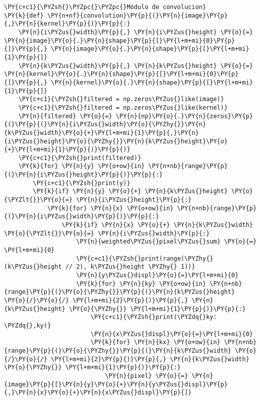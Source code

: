 \begin{tcolorbox}[breakable, size=fbox, boxrule=1pt, pad at break*=1mm,colback=cellbackground, colframe=cellborder]
\begin{Verbatim}[commandchars=\\\{\}]
\PY{c+c1}{\PYZsh{}\PYZpc{}\PYZpc{}Módulo de convolucion}
\PY{k}{def} \PY{n+nf}{convolution}\PY{p}{(}\PY{n}{image}\PY{p}{,}\PY{n}{kernel}\PY{p}{)}\PY{p}{:}
    \PY{n}{i\PYZus{}width}\PY{p}{,} \PY{n}{i\PYZus{}height} \PY{o}{=} \PY{n}{image}\PY{o}{.}\PY{n}{shape}\PY{p}{[}\PY{l+m+mi}{0}\PY{p}{]}\PY{p}{,} \PY{n}{image}\PY{o}{.}\PY{n}{shape}\PY{p}{[}\PY{l+m+mi}{1}\PY{p}{]}
    \PY{n}{k\PYZus{}width}\PY{p}{,} \PY{n}{k\PYZus{}height} \PY{o}{=} \PY{n}{kernel}\PY{o}{.}\PY{n}{shape}\PY{p}{[}\PY{l+m+mi}{0}\PY{p}{]}\PY{p}{,} \PY{n}{kernel}\PY{o}{.}\PY{n}{shape}\PY{p}{[}\PY{l+m+mi}{1}\PY{p}{]}
    \PY{c+c1}{\PYZsh{}filtered = np.zeros\PYZus{}like(image)}
    \PY{c+c1}{\PYZsh{}filtered = np.zeros\PYZus{}like(kernel)}
    \PY{n}{filtered} \PY{o}{=} \PY{n}{np}\PY{o}{.}\PY{n}{zeros}\PY{p}{(}\PY{p}{(}\PY{n}{i\PYZus{}width}\PY{o}{\PYZhy{}}\PY{n}{k\PYZus{}width}\PY{o}{+}\PY{l+m+mi}{1}\PY{p}{,}\PY{n}{i\PYZus{}height}\PY{o}{\PYZhy{}}\PY{n}{k\PYZus{}height}\PY{o}{+}\PY{l+m+mi}{1}\PY{p}{)}\PY{p}{)}
    \PY{c+c1}{\PYZsh{}print(filtered)}
    \PY{k}{for} \PY{n}{y} \PY{o+ow}{in} \PY{n+nb}{range}\PY{p}{(}\PY{n}{i\PYZus{}height}\PY{p}{)}\PY{p}{:}
        \PY{c+c1}{\PYZsh{}print(y)}
        \PY{k}{if} \PY{n}{y} \PY{o}{+} \PY{n}{k\PYZus{}height} \PY{o}{\PYZlt{}}\PY{o}{=} \PY{n}{i\PYZus{}height}\PY{p}{:}
            \PY{k}{for} \PY{n}{x} \PY{o+ow}{in} \PY{n+nb}{range}\PY{p}{(}\PY{n}{i\PYZus{}width}\PY{p}{)}\PY{p}{:}
                \PY{k}{if} \PY{n}{x} \PY{o}{+} \PY{n}{k\PYZus{}width} \PY{o}{\PYZlt{}}\PY{o}{=} \PY{n}{i\PYZus{}width}\PY{p}{:}
                    \PY{n}{weighted\PYZus{}pixel\PYZus{}sum} \PY{o}{=} \PY{l+m+mi}{0}
                    \PY{c+c1}{\PYZsh{}print(range(\PYZhy{}(k\PYZus{}height // 2), k\PYZus{}height \PYZhy{} 1))}
                    \PY{n}{y\PYZus{}displ}\PY{o}{=}\PY{l+m+mi}{0}
                    \PY{k}{for} \PY{n}{ky} \PY{o+ow}{in} \PY{n+nb}{range}\PY{p}{(}\PY{o}{\PYZhy{}}\PY{p}{(}\PY{n}{k\PYZus{}height} \PY{o}{/}\PY{o}{/} \PY{l+m+mi}{2}\PY{p}{)}\PY{p}{,} \PY{n}{k\PYZus{}height} \PY{o}{\PYZhy{}} \PY{l+m+mi}{1}\PY{p}{)}\PY{p}{:}
                        \PY{c+c1}{\PYZsh{}print(\PYZdq{}ky: \PYZdq{},ky)}
                        \PY{n}{x\PYZus{}displ}\PY{o}{=}\PY{l+m+mi}{0}
                        \PY{k}{for} \PY{n}{kx} \PY{o+ow}{in} \PY{n+nb}{range}\PY{p}{(}\PY{o}{\PYZhy{}}\PY{p}{(}\PY{n}{k\PYZus{}width} \PY{o}{/}\PY{o}{/} \PY{l+m+mi}{2}\PY{p}{)}\PY{p}{,} \PY{n}{k\PYZus{}width} \PY{o}{\PYZhy{}} \PY{l+m+mi}{1}\PY{p}{)}\PY{p}{:}
                            \PY{n}{pixel} \PY{o}{=} \PY{n}{image}\PY{p}{[}\PY{n}{y}\PY{o}{+}\PY{n}{y\PYZus{}displ}\PY{p}{,}\PY{n}{x}\PY{o}{+}\PY{n}{x\PYZus{}displ}\PY{p}{]}

\end{Verbatim}
\end{tcolorbox}

